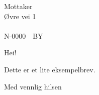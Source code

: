 \documentclass[a4paper,norsk]{brev}
\begin{document}
\address{Veien 133\\\ \\9999\ \ LANGTVEKKISTAN}


\begin{letter}{Mottaker\\
               Øvre vei 1\\
               \ \\
               N-0000\ \ BY}
  
\opening{Hei!}

Dette er et lite eksempelbrev.

\closing{Med vennlig hilsen}

\end{letter}
\end{document}
